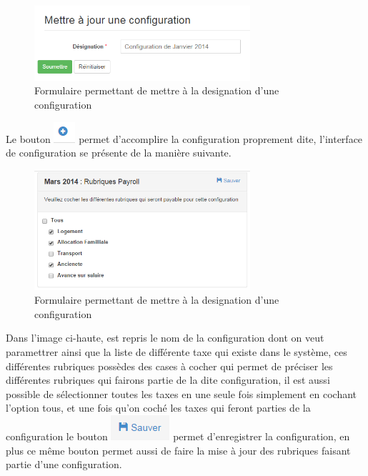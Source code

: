 \documentclass[12pt,a4paper]{report}
\begin{document}
\begin{figure}[h]
\begin{center}
\includegraphics[width=8cm]{pic/UpDConfgRub.png}
\end{center}
\caption{Formulaire permettant de mettre à la designation d'une configuration}
\label{Formulaire permettant de mettre à la designation d'une configuration}
\end{figure} 

Le bouton  \includegraphics[scale=0.7]{pic/PlusConfigBlue.png} permet d'accomplire la configuration proprement dite, l'interface de configuration se présente de la manière suivante.  
\begin{figure}[h]
\begin{center}
\includegraphics[width=8cm]{pic/ConfigRubMenu.png}
\end{center}
\caption{Formulaire permettant de mettre à la designation d'une configuration}
\label{Formulaire permettant de mettre à la designation d'une configuration}
\end{figure} 

Dans l'image ci-haute, est repris le nom de la configuration dont on veut paramettrer ainsi que la liste de différente taxe qui existe dans le système, ces différentes rubriques possèdes des cases à cocher qui permet de préciser les différentes rubriques qui fairons partie de la dite configuration, il est aussi possible de sélectionner toutes les taxes en une seule fois simplement en cochant l'option tous, et une fois qu'on coché les taxes qui feront parties de la configuration le bouton \includegraphics[scale=0.7]{pic/SaveConfig.png} permet d'enregistrer la configuration, en plus ce même bouton permet aussi de faire la mise à jour des rubriques faisant partie d'une configuration.
\end{document}
